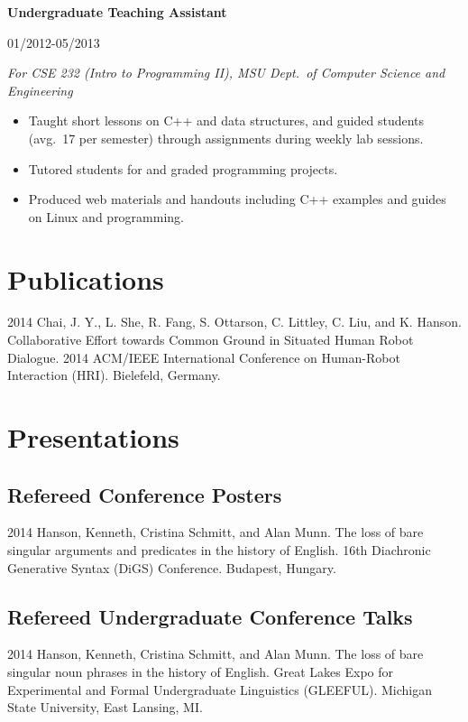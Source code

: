 \documentclass[10pt,oneside]{article}
\newcommand{\ressection}[1]{
	\vspace{-12pt}
	\section*{#1}
}
\newcommand{\ressubsection}[1]{
	\subsection*{#1}
	\vspace{-4pt}
}
\newcommand{\resbigitem}[4]{
	\item \parbox[t]{0.8\textwidth}{\textbf{#1}} \hfill #2 \\
		\parbox[t]{0.8\textwidth}{\textit{#3}} \hfill \textit{#4}
}
\begin{document}
\begin{reslist}
	\resbigitem{Undergraduate Teaching Assistant}
		{01/2012-05/2013}
		{For CSE 232 (Intro to Programming II), MSU Dept.\ of Computer Science and Engineering}
		{}
	\begin{itemize}
		\item Taught short lessons on C++ and data structures, and guided students (avg.\ 17 per semester) through assignments during weekly lab sessions.
		\item Tutored students for and graded programming projects.
		\item Produced web materials and handouts including C++ examples and guides on Linux and programming.
	\end{itemize}
\end{reslist}


\ressection{Publications}

\begin{publist}
	\item[2014] {Chai, J. Y., L. She, R. Fang, S. Ottarson, C. Littley, C. Liu, and K. Hanson. Collaborative Effort towards Common Ground in Situated Human Robot Dialogue. 2014 ACM/IEEE International Conference on Human-Robot Interaction (HRI). Bielefeld, Germany.}
\end{publist}


\ressection{Presentations}

\ressubsection{Refereed Conference Posters}
\begin{publist}
	\item[2014] {Hanson, Kenneth, Cristina Schmitt, and Alan Munn. The loss of bare singular arguments and predicates in the history of English. 16th Diachronic Generative Syntax (DiGS) Conference. Budapest, Hungary.}
\end{publist}

\ressubsection{Refereed Undergraduate Conference Talks}
\begin{publist}
	\item[2014] {Hanson, Kenneth, Cristina Schmitt, and Alan Munn. The loss of bare singular noun phrases in the history of English. Great Lakes Expo for Experimental and Formal Undergraduate Linguistics (GLEEFUL). Michigan State University, East Lansing, MI.}
\end{publist}
\end{document}
